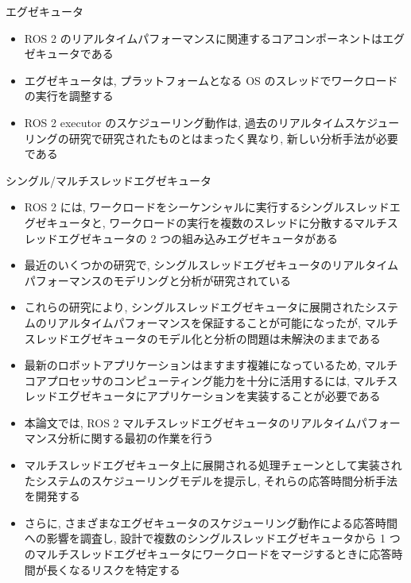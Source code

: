 \begin{frame}{エグゼキュータ}
    \begin{itemize}

        \item ROS 2 のリアルタイムパフォーマンスに関連するコアコンポーネントはエグゼキュータである
        \item エグゼキュータは, プラットフォームとなる OS のスレッドでワークロードの実行を調整する
        \item ROS 2 executor のスケジューリング動作は, 過去のリアルタイムスケジューリングの研究で研究されたものとはまったく異なり, 新しい分析手法が必要である

    \end{itemize}
\end{frame}

\begin{frame}{シングル/マルチスレッドエグゼキュータ}
    \begin{itemize}
        \item ROS 2 には, ワークロードをシーケンシャルに実行するシングルスレッドエグゼキュータと, ワークロードの実行を複数のスレッドに分散するマルチスレッドエグゼキュータの 2 つの組み込みエグゼキュータがある

        \item 最近のいくつかの研究で, シングルスレッドエグゼキュータのリアルタイムパフォーマンスのモデリングと分析が研究されている

        \item これらの研究により, シングルスレッドエグゼキュータに展開されたシステムのリアルタイムパフォーマンスを保証することが可能になったが, マルチスレッドエグゼキュータのモデル化と分析の問題は未解決のままである
    \end{itemize}
\end{frame}

\begin{frame}{}
    \begin{itemize}
        \item 最新のロボットアプリケーションはますます複雑になっているため, マルチコアプロセッサのコンピューティング能力を十分に活用するには, マルチスレッドエグゼキュータにアプリケーションを実装することが必要である
        \item 本論文では, ROS 2 マルチスレッドエグゼキュータのリアルタイムパフォーマンス分析に関する最初の作業を行う
        \item マルチスレッドエグゼキュータ上に展開される処理チェーンとして実装されたシステムのスケジューリングモデルを提示し, それらの応答時間分析手法を開発する
        \item さらに, さまざまなエグゼキュータのスケジューリング動作による応答時間への影響を調査し, 設計で複数のシングルスレッドエグゼキュータから 1 つのマルチスレッドエグゼキュータにワークロードをマージするときに応答時間が長くなるリスクを特定する
    \end{itemize}
\end{frame}
